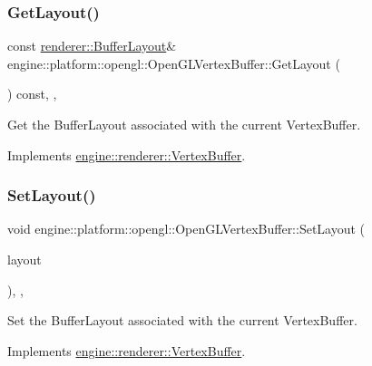 \subsubsection{\texorpdfstring{Get\+Layout()}{GetLayout()}}
{\footnotesize\ttfamily const \hyperlink{classengine_1_1renderer_1_1BufferLayout}{renderer\+::\+Buffer\+Layout}\& engine\+::platform\+::opengl\+::\+Open\+G\+L\+Vertex\+Buffer\+::\+Get\+Layout (\begin{DoxyParamCaption}{ }\end{DoxyParamCaption}) const\hspace{0.3cm}{\ttfamily [inline]}, {\ttfamily [override]}, {\ttfamily [virtual]}}

Get the Buffer\+Layout associated with the current Vertex\+Buffer. 

Implements \hyperlink{classengine_1_1renderer_1_1VertexBuffer_a3186b40aa8c8c471fe80c29645859aa5}{engine\+::renderer\+::\+Vertex\+Buffer}.

\mbox{\label{classengine_1_1platform_1_1opengl_1_1OpenGLVertexBuffer_a957a9dc55dc35ce4302654e1a394e5f8}} 
\subsubsection{\texorpdfstring{Set\+Layout()}{SetLayout()}}
{\footnotesize\ttfamily void engine\+::platform\+::opengl\+::\+Open\+G\+L\+Vertex\+Buffer\+::\+Set\+Layout (\begin{DoxyParamCaption}\item[{const \hyperlink{classengine_1_1renderer_1_1BufferLayout}{renderer\+::\+Buffer\+Layout} \&}]{layout }\end{DoxyParamCaption})\hspace{0.3cm}{\ttfamily [inline]}, {\ttfamily [override]}, {\ttfamily [virtual]}}

Set the Buffer\+Layout associated with the current Vertex\+Buffer. 

Implements \hyperlink{classengine_1_1renderer_1_1VertexBuffer_afad191b22fec9bc2519e43d543e5c75e}{engine\+::renderer\+::\+Vertex\+Buffer}.

\mbox{\label{classengine_1_1platform_1_1opengl_1_1OpenGLVertexBuffer_a9069ca746c0de9dd9418ba9c5ee7b67b}} 
